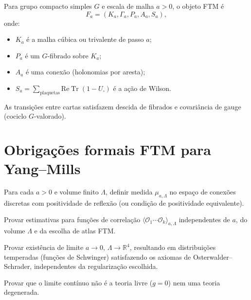 \documentclass[11pt,a4paper]{article}
\begin{document}
\begin{definition}
Para grupo compacto simples $G$ e escala de malha $a>0$,
o objeto FTM é
\[
  F_a = (K_a,\Gamma_a,P_a,A_a,S_a),
\]
onde:
\begin{itemize}[leftmargin=2em]
  \item $K_a$ é a malha cúbica ou trivalente de passo $a$;
  \item $P_a$ é um $G$-fibrado sobre $K_a$;
  \item $A_a$ é uma conexão (holonomias por aresta);
  \item $S_a=\sum_{\text{plaquetas}} \mathrm{Re}\operatorname{Tr}(1-U_\square)$
    é a ação de Wilson.
\end{itemize}
As transições entre cartas satisfazem descida de fibrados e
covariância de gauge (cociclo $G$-valorado).
\end{definition}

\section{Obrigações formais FTM para Yang–Mills}

\begin{obligation}[YM1 — Regularização]\label{ob:YM1}
Para cada $a>0$ e volume finito $\Lambda$, definir medida $\mu_{a,\Lambda}$
no espaço de conexões discretas com positividade de reflexão
(ou condição de positividade equivalente).
\end{obligation}

\begin{obligation}\label{ob:YM2}
Provar estimativas para funções de correlação
$\langle\mathcal O_1\cdots\mathcal O_k\rangle_{a,\Lambda}$
independentes de $a$, do volume $\Lambda$ e da escolha de atlas FTM.
\end{obligation}

\begin{obligation}\label{ob:YM3}
Provar existência de limite $a\to0$, $\Lambda\to\mathbb R^4$,
resultando em distribuições temperadas (funções de Schwinger)
satisfazendo os axiomas de Osterwalder–Schrader, independentes
da regularização escolhida.
\end{obligation}

\begin{obligation}\label{ob:YM4}
Provar que o limite contínuo não é a teoria livre ($g=0$)
nem uma teoria degenerada.
\end{obligation}
\end{document}
